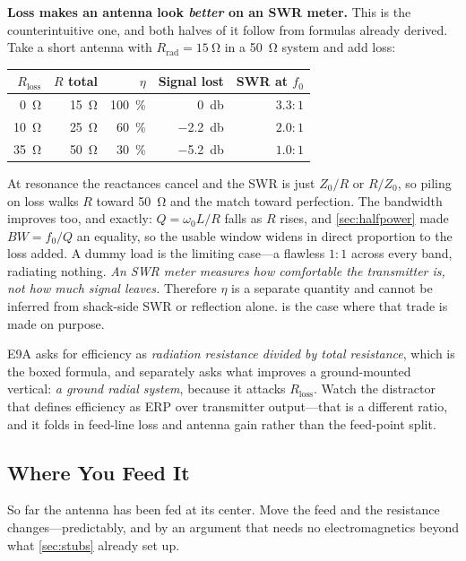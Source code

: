 \begin{mistakebox}
\textbf{Loss makes an antenna look \emph{better} on an SWR meter.} This is the
counterintuitive one, and both halves of it follow from formulas already derived. Take
a short antenna with \(R_{\text{rad}}=\SI{15}{\ohm}\) in a \SI{50}{\ohm} system and
add loss:

\begin{center}
\begin{tabular}{@{}rrrrr@{}}
\toprule
\(R_{\text{loss}}\) & \(R\) total & \(\eta\) & Signal lost & SWR at \(f_0\) \\
\midrule
\SI{0}{\ohm}  & \SI{15}{\ohm} & \SI{100}{\percent} & \SI{0}{\decibel}    & \(3.3{:}1\) \\
\SI{10}{\ohm} & \SI{25}{\ohm} & \SI{60}{\percent}  & \SI{-2.2}{\decibel} & \(2.0{:}1\) \\
\SI{35}{\ohm} & \SI{50}{\ohm} & \SI{30}{\percent}  & \SI{-5.2}{\decibel} & \(1.0{:}1\) \\
\bottomrule
\end{tabular}
\end{center}

At resonance the reactances cancel and the SWR is just \(Z_0/R\) or \(R/Z_0\), so
piling on loss walks \(R\) toward \SI{50}{\ohm} and the match toward perfection. The
bandwidth improves too, and exactly: \(Q=\omega_0L/R\) falls as \(R\) rises, and
\cref{sec:halfpower} made \(BW=f_0/Q\) an equality, so the usable window widens in
direct proportion to the loss added. A dummy load is the limiting case---a flawless
\(1{:}1\) across every band, radiating nothing. \emph{An SWR meter measures how
comfortable the transmitter is, not how much signal leaves.} Therefore \(\eta\) is a
separate quantity and cannot be inferred from shack-side SWR or reflection alone.
 is the case where that trade is made on purpose.
\end{mistakebox}

\begin{exambox}
E9A asks for efficiency as \emph{radiation resistance divided by total resistance},
which is the boxed formula, and separately asks what improves a ground-mounted
vertical: \emph{a ground radial system}, because it attacks \(R_{\text{loss}}\).
Watch the distractor that defines efficiency as ERP over transmitter output---that is
a different ratio, and it folds in feed-line loss and antenna gain rather than the
feed-point split.
\end{exambox}

\subsection{Where You Feed It}
\label{sec:feedpoint}
So far the antenna has been fed at its center. Move the feed and the resistance
changes---predictably, and by an argument that needs no electromagnetics beyond what
\cref{sec:stubs} already set up.

